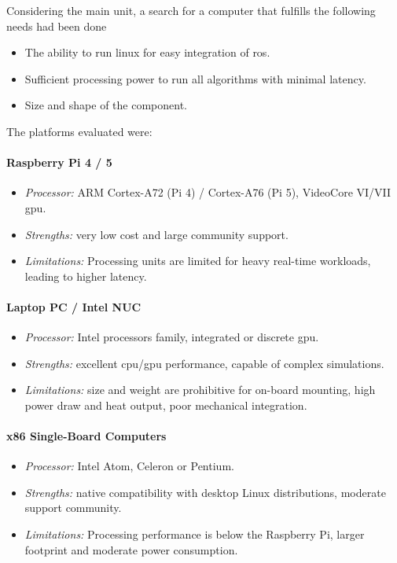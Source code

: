 Considering the main unit, a search for a computer that fulfills the following needs had been done
\begin{itemize}
  \item The ability to run \gls{linux} for easy integration of \gls{ros}.
  \item Sufficient processing power to run all algorithms with minimal \gls{latency}.
  \item Size and shape of the component.
\end{itemize}

The platforms evaluated were:

\paragraph*{Raspberry Pi 4 / 5}
\begin{itemize}
  \item \emph{Processor:} ARM Cortex-A72 (Pi 4) / Cortex-A76 (Pi 5), VideoCore VI/VII \gls{gpu}.
  \item \emph{Strengths:} very low cost and large community support.
  \item \emph{Limitations:} Processing units are limited for heavy real-time workloads, leading to higher latency.
\end{itemize}

\paragraph*{Laptop PC / Intel NUC}
\begin{itemize}
  \item \emph{Processor:} Intel processors family, integrated or discrete \gls{gpu}.
  \item \emph{Strengths:} excellent \gls{cpu}/\gls{gpu} performance, capable of complex simulations.
  \item \emph{Limitations:} size and weight are prohibitive for on-board mounting, high power draw and heat output, poor mechanical integration.
\end{itemize}

\paragraph*{x86 Single-Board Computers}
\begin{itemize}
  \item \emph{Processor:} Intel Atom, Celeron or Pentium.
  \item \emph{Strengths:} native compatibility with desktop Linux distributions, moderate support community.
  \item \emph{Limitations:} Processing performance is below the Raspberry Pi, larger footprint and moderate power consumption.
\end{itemize}

